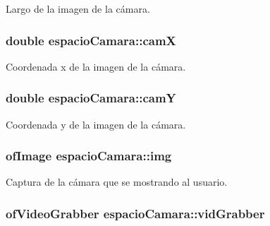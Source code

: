 Largo de la imagen de la cámara. 

\hypertarget{classespacio_camara_ac94dd88aad08d2077050c79e490d0a37}{}
\subsubsection[{cam\+X}]{\setlength{\rightskip}{0pt plus 5cm}double espacio\+Camara\+::cam\+X\hspace{0.3cm}{\ttfamily [private]}}\label{classespacio_camara_ac94dd88aad08d2077050c79e490d0a37}


Coordenada x de la imagen de la cámara. 

\hypertarget{classespacio_camara_a0dec829b25bb09c1f70150f885d9843e}{}
\subsubsection[{cam\+Y}]{\setlength{\rightskip}{0pt plus 5cm}double espacio\+Camara\+::cam\+Y\hspace{0.3cm}{\ttfamily [private]}}\label{classespacio_camara_a0dec829b25bb09c1f70150f885d9843e}


Coordenada y de la imagen de la cámara. 

\hypertarget{classespacio_camara_a71d14cf73376b62e3158e90a6f72d18f}{}
\subsubsection[{img}]{\setlength{\rightskip}{0pt plus 5cm}of\+Image espacio\+Camara\+::img\hspace{0.3cm}{\ttfamily [private]}}\label{classespacio_camara_a71d14cf73376b62e3158e90a6f72d18f}


Captura de la cámara que se mostrando al usuario. 

\hypertarget{classespacio_camara_a005166cb15e10461341d0e28b145134f}{}
\subsubsection[{vid\+Grabber}]{\setlength{\rightskip}{0pt plus 5cm}of\+Video\+Grabber espacio\+Camara\+::vid\+Grabber\hspace{0.3cm}{\ttfamily [private]}}\label{classespacio_camara_a005166cb15e10461341d0e28b145134f}


